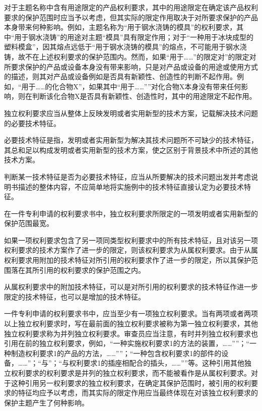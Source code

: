 对于主题名称中含有用途限定的产品权利要求，其中的用途限定在确定该产品权利要求的保护范围时应当予以考虑，但其实际的限定作用取决于对所要求保护的产品本身带来何种影响。例如，主题名称为“用于钢水浇铸的模具”的权利要求，其中“用于钢水浇铸”的用途对主题“模具”具有限定作用；对于“一种用于冰块成型的塑料模盒”，因其熔点远低于“用于钢水浇铸的模具”的熔点，不可能用于钢水浇铸，故不在上述权利要求的保护范围内。然而，如果“用于……”的限定对”的限定对所要求保护的产品或设备本身没有带来影响，只是对产品或设备的用途或使用方式的描述，则其对产品或设备例如是否具有新颖性、创造性的判断不起作用。例如，“用于……的化合物X”，如果其中“用于……””对化合物X本身没有带来任何影响，则在判断该化合物X是否具有新颖性、创造性时，其中的用途限定不起作用。

独立权利要求应当从整体上反映发明或者实用新型的技术方案，记载解决技术问题的必要技术特征。

必要技术特征是指，发明或者实用新型为解决其技术问题所不可缺少的技术特征，其总和足以构成发明或者实用新型的技术方案，使之区别于背景技术中所述的其他技术方案。

判断某一技术特征是否为必要技术特征，应当从所要解决的技术问题出发并考虑说明书描述的整体内容，不应简单地将实施例中的技术特征直接认定为必要技术特征。

在一件专利申请的权利要求书中，独立权利要求所限定的一项发明或者实用新型的保护范围最宽。

如果一项权利要求包含了另一项同类型权利要求中的所有技术特征，且对该另一项权利要求的技术方案作了进一步的限定，则该权利要求为从属权利要求。由于从属权利要求用附加的技术特征对所引用的权利要求作了进一步的限定，所以其保护范围落在其所引用的权利要求的保护范围之内。

从属权利要求中的附加技术特征，可以是对所引用的权利要求的技术特征作进一步限定的技术特征，也可以是增加的技术特征。

一件专利申请的权利要求书中，应当至少有一项独立权利要求。当有两项或者两项以上独立权利要求时，写在最前面的独立权利要求被称为第一独立权利要求，其他独立权利要求称为并列独立权利要求。审查员应当注意，有时并列独立权利要求也引用在前的独立权利要求，例如，“一种实施权利要求1的方法的装置，……””；“一种制造权利要求1的产品的方法，……””；“一种包含权利要求1的部件的设备，……”；“与”；“与权利要求1的插座相配合的插头，……””等。这种引用其他独立权利要求的权利要求是并列的独立权利要求，而不能被看作是从属权利要求。对于这种引用另一权利要求的独立权利要求，在确定其保护范围时，被引用的权利要求的特征均应予以考虑，而其实际的限定作用应当最终体现在对该独立权利要求的保护主题产生了何种影响。

